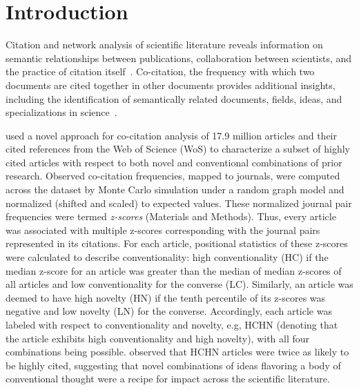 \documentclass[NETN]{stjour}
\begin{document}


\section{Introduction}

Citation and network analysis of  scientific literature reveals information on semantic relationships between publications, collaboration between scientists, and the practice of citation itself~\citep{garfield_citation_1955,de_solla_price_networks_1965,newman_structure_2001,Shi:2010:CHI:1816123.1816131,patience_pmid28560354}. Co-citation, the frequency with which two documents are cited together in other documents provides additional insights, including the identification of semantically related documents, fields, ideas, and specializations in science~\citep{small_co-citation_1973,marshakova-shaikevich_co-citation_1973,boyack_co-citation_2010, 10.3389/frma.2018.00020}. 

\citep{uzzi_atypical_2013} used a novel approach for co-citation analysis of 17.9 million articles and their cited references from the Web of Science (WoS)  to characterize a subset of highly cited articles with respect to both novel and conventional combinations of prior research. Observed co-citation frequencies, mapped to journals, were computed across the dataset by Monte Carlo simulation under a random graph model and normalized (shifted and scaled) to expected values. These normalized journal pair frequencies were termed \emph{z-scores} (Materials and Methods). Thus, every article was associated with multiple z-scores corresponding with the journal pairs represented in its citations. For each article, positional statistics of these z-scores were calculated to describe conventionality: high conventionality (HC) if the median z-score for an article was greater than the median of median z-scores of all articles and low conventionality for the converse (LC). Similarly,  an article was deemed to have high novelty (HN) if the tenth percentile of its z-scores  was negative and low novelty (LN) for the converse. Accordingly, each article was labeled with respect to conventionality and novelty, e.g, HCHN (denoting that the article exhibits high conventionality and high novelty), with all four combinations being possible. 
\citep{uzzi_atypical_2013} observed that HCHN articles were twice as likely to be highly cited, suggesting that novel combinations of ideas flavoring a body of conventional thought were a recipe for impact across the scientific literature. 
\end{document}
